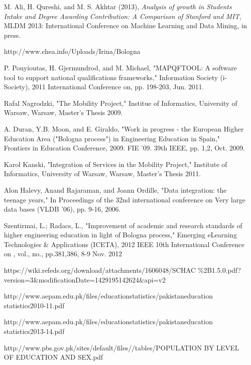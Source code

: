 \documentclass[12pt,a4paper,oneside]{book}
\begin{document}
\begin{thebibliography}{10}

M. Ali, H. Qureshi, and M. S. Akhtar (2013), \emph{Analysis of growth in Students Intake and Degree Awarding Contribution: A Comparison of Stanford and MIT}, MLDM 2013: International Conference on Machine Learning and Data Mining, in press.

http://www.ehea.info/Uploads/Irina/Bologna%

P. Pouyioutas, H. Gjermundrod, and M. Michael, "MAPQFTOOL: A software tool to support national qualifications frameworks," Information Society (i-Society), 2011 International Conference on, pp. 198-203, Jun. 2011.

Rafal Nagrodzki, "The Mobility Project," Institue of Informatics, University of Warsaw, Warsaw, Master's Thesis 2009.

A. Duran, Y.B. Moon, and E. Giraldo, "Work in progress - the European Higher Education Area ("Bologna process") in Engineering Education in Spain," Frontiers in Education Conference, 2009. FIE '09. 39th IEEE, pp. 1,2, Oct. 2009.

Karol Kanski, "Integration of Services in the Mobility Project," Institute of Informatics, University of Warsaw, Warsaw, Master's Thesis 2011.

Alon Halevy, Anand Rajaraman, and Joann Ordille, "Data integration: the teenage years," In Proceedings of the 32nd international conference on Very large data bases (VLDB '06), pp. 9-16, 2006.

Szentirmai, L.; Radacs, L., "Improvement of academic and research standards of higher engineering education in light of Bologna process," Emerging eLearning Technologies \& Applications (ICETA), 2012 IEEE 10th International Conference on , vol., no., pp.381,386, 8-9 Nov. 2012

https://wiki.refeds.org/download/attachments/1606048/SCHAC
\%2B1.5.0.pdf?version=3\&modificationDate=1429195142624\&api=v2

http://www.aepam.edu.pk/files/educationstatistics/pakistaneducation
statistics2010-11.pdf

http://www.aepam.edu.pk/files/educationstatistics/pakistaneducation
statistics2013-14.pdf

http://www.pbs.gov.pk/sites/default/files//tables/POPULATION BY LEVEL OF EDUCATION AND SEX.pdf

\end{thebibliography}
\end{document}
